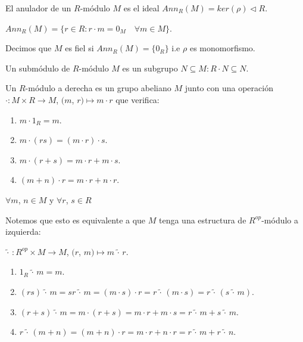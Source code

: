 \begin{definition}[Anulador]
    El anulador de un \(R\)-módulo \(M\) es el ideal \(Ann_R(M) = ker(\rho) \triangleleft R\).

    \(Ann_R(M) = \{ r \in R : r \cdot m = 0_M \quad \forall m \in M \}\).

    Decimos que \(M\) es fiel si \(Ann_R(M) = \{0_R\}\) i.e \(\rho\) es monomorfismo.
\end{definition}

\begin{definition}[Submódulo]
    Un submódulo de \(R\)-módulo \(M\) es un subgrupo \(N \subseteq M : R \cdot N \subseteq N\).
\end{definition}

\begin{definition}
    Un \(R\)-módulo a derecha es un grupo abeliano \(M\) junto con una operación \(\cdot : M \times R \to M\), \((m\), \(r) \mapsto m \cdot r\) que verifica: \begin{enumerate}
        \item \(m \cdot 1_R = m\).
        \item \(m \cdot (rs) = (m \cdot r) \cdot s\).
        \item \(m \cdot (r + s) = m \cdot r + m \cdot s\).
        \item \((m + n) \cdot r = m \cdot r + n \cdot r\).
    \end{enumerate}
    \(\forall m\), \(n \in M\) y \(\forall r\), \(s \in R\)
\end{definition}

Notemos que esto es equivalente a que \(M\) tenga una estructura de \(R^{op}\)-módulo a izquierda:

\(\tilde{\cdot} \, : R^{op} \times M \to M\), \((r\), \(m) \mapsto m \, \tilde{\cdot} \, r\).
\begin{enumerate}
    \item \(1_R \, \tilde{\cdot} \, m = m\).
    \item \((rs) \, \tilde{\cdot} \, m = sr \, \tilde{\cdot} \, m = (m \cdot s) \cdot r = r \, \tilde{\cdot} \, (m \cdot s) = r \, \tilde{\cdot} \, (s \, \tilde{\cdot} \, m)\).
    \item \((r + s) \, \tilde{\cdot} \, m = m \cdot (r + s) = m \cdot r + m \cdot s = r \, \tilde{\cdot} \, m + s \, \tilde{\cdot} \, m\).
    \item \( r \, \tilde{\cdot} \, (m + n) = (m + n) \cdot r = m \cdot r + n \cdot r = r \, \tilde{\cdot} \, m + r \, \tilde{\cdot} \, n\).
\end{enumerate}

